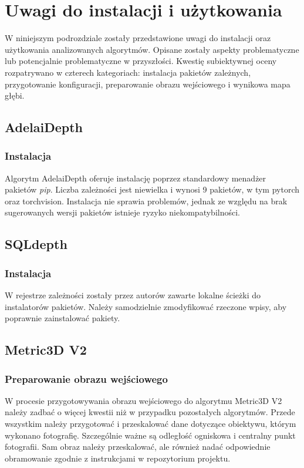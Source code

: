 \section{Uwagi do instalacji i użytkowania}
W niniejszym podrozdziale zostały przedstawione uwagi do instalacji oraz użytkowania analizowanych algorytmów. Opisane zostały aspekty problematyczne lub potencjalnie problematyczne w przyszłości. Kwestię subiektywnej oceny rozpatrywano w czterech kategoriach: instalacja pakietów zależnych, przygotowanie konfiguracji, preparowanie obrazu wejściowego i wynikowa mapa głębi.

\subsection{AdelaiDepth}
\subsubsection{Instalacja}
Algorytm AdelaiDepth oferuje instalację poprzez standardowy menadżer pakietów \textit{pip}. Liczba zależności jest niewielka i wynosi 9 pakietów, w tym pytorch oraz torchvision. Instalacja nie sprawia problemów, jednak ze względu na brak sugerowanych wersji pakietów istnieje ryzyko niekompatybilności.

\subsection{SQLdepth}
\subsubsection{Instalacja}
W rejestrze zależności zostały przez autorów zawarte lokalne ścieżki do instalatorów pakietów. Należy samodzielnie zmodyfikować rzeczone wpisy, aby poprawnie zainstalować pakiety.

\subsection{Metric3D V2}
\subsubsection{Preparowanie obrazu wejściowego}
W procesie przygotowywania obrazu wejściowego do algorytmu Metric3D V2 należy zadbać o więcej kwestii niż w przypadku pozostałych algorytmów. Przede wszystkim należy przygotować i przeskalować dane dotyczące obiektywu, którym wykonano fotografię. Szczególnie ważne są odległość ogniskowa i centralny punkt fotografii. Sam obraz należy przeskalować, ale również nadać odpowiednie obramowanie zgodnie z instrukcjami w repozytorium projektu.

